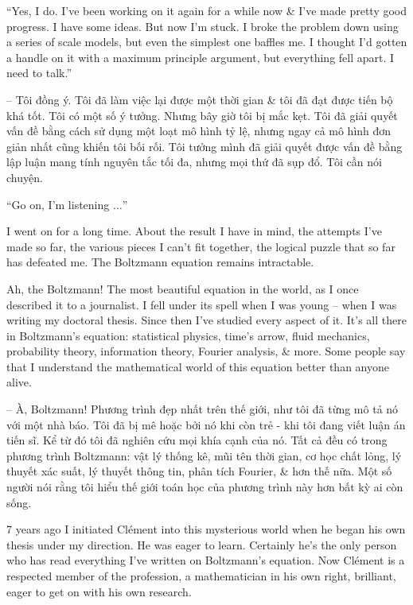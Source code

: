\documentclass{article}
\begin{document}
\begin{enumerate}
	``Yes, I do. I've been working on it again for a while now \& I've made pretty good progress. I have some ideas. But now I'm stuck. I broke the problem down using a series of scale models, but even the simplest one baffles me. I thought I'd gotten a handle on it with a maximum principle argument, but everything fell apart. I need to talk.''
	
	-- Tôi đồng ý. Tôi đã làm việc lại được một thời gian \& tôi đã đạt được tiến bộ khá tốt. Tôi có một số ý tưởng. Nhưng bây giờ tôi bị mắc kẹt. Tôi đã giải quyết vấn đề bằng cách sử dụng một loạt mô hình tỷ lệ, nhưng ngay cả mô hình đơn giản nhất cũng khiến tôi bối rối. Tôi tưởng mình đã giải quyết được vấn đề bằng lập luận mang tính nguyên tắc tối đa, nhưng mọi thứ đã sụp đổ. Tôi cần nói chuyện.
	
	``Go on, I'm listening $\ldots$''
	
	I went on for a long time. About the result I have in mind, the attempts I've made so far, the various pieces I can't fit together, the logical puzzle that so far has defeated me. The Boltzmann equation remains intractable.
	
	Ah, the Boltzmann! The most beautiful equation in the world, as I once described it to a journalist. I fell under its spell when I was young -- when I was writing my doctoral thesis. Since then I've studied every aspect of it. It's all there in Boltzmann's equation: statistical physics, time's arrow, fluid mechanics, probability theory, information theory, Fourier analysis, \& more. Some people say that I understand the mathematical world of this equation better than anyone alive.
	
	-- À, Boltzmann! Phương trình đẹp nhất trên thế giới, như tôi đã từng mô tả nó với một nhà báo. Tôi đã bị mê hoặc bởi nó khi còn trẻ - khi tôi đang viết luận án tiến sĩ. Kể từ đó tôi đã nghiên cứu mọi khía cạnh của nó. Tất cả đều có trong phương trình Boltzmann: vật lý thống kê, mũi tên thời gian, cơ học chất lỏng, lý thuyết xác suất, lý thuyết thông tin, phân tích Fourier, \& hơn thế nữa. Một số người nói rằng tôi hiểu thế giới toán học của phương trình này hơn bất kỳ ai còn sống.
	
	7 years ago I initiated {\sc Cl\'ement} into this mysterious world when he began his own thesis under my direction. He was eager to learn. Certainly he's the only person who has read everything I've written on Boltzmann's equation. Now {\sc Cl\'ement} is a respected member of the profession, a mathematician in his own right, brilliant, eager to get on with his own research.
	

\end{enumerate}
\end{document}
